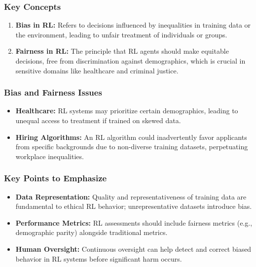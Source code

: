 \documentclass{beamer}
\begin{document}
\begin{frame}[fragile]
    \frametitle{Key Concepts}
    \begin{enumerate}
        \item \textbf{Bias in RL:} Refers to decisions influenced by inequalities in training data or the environment, leading to unfair treatment of individuals or groups.
        
        \item \textbf{Fairness in RL:} The principle that RL agents should make equitable decisions, free from discrimination against demographics, which is crucial in sensitive domains like healthcare and criminal justice.
    \end{enumerate}
\end{frame}

\begin{frame}[fragile]
    \frametitle{Bias and Fairness Issues}
    \begin{itemize}
        \item \textbf{Healthcare:} RL systems may prioritize certain demographics, leading to unequal access to treatment if trained on skewed data.
        
        \item \textbf{Hiring Algorithms:} An RL algorithm could inadvertently favor applicants from specific backgrounds due to non-diverse training datasets, perpetuating workplace inequalities.
    \end{itemize}
\end{frame}

\begin{frame}[fragile]
    \frametitle{Key Points to Emphasize}
    \begin{itemize}
        \item \textbf{Data Representation:} Quality and representativeness of training data are fundamental to ethical RL behavior; unrepresentative datasets introduce bias.
        
        \item \textbf{Performance Metrics:} RL assessments should include fairness metrics (e.g., demographic parity) alongside traditional metrics.
        
        \item \textbf{Human Oversight:} Continuous oversight can help detect and correct biased behavior in RL systems before significant harm occurs.
    \end{itemize}
\end{frame}
\end{document}
